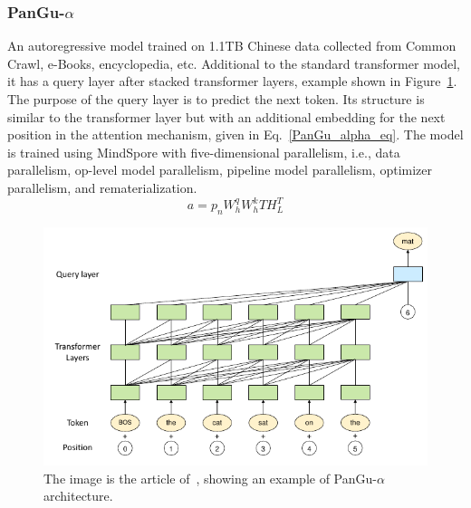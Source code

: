 \subsubsection{PanGu-$\alpha$~\cite{PanGU_alpha}}
An autoregressive model trained on 1.1TB Chinese data collected from Common Crawl, e-Books, encyclopedia, etc. Additional to the standard transformer model, it has a query layer after stacked transformer layers, example shown in Figure~\ref{pangu_alpha_image}. The purpose of the query layer is to predict the next token. Its structure is similar to the transformer layer but with an additional embedding for the next position in the attention mechanism, given in Eq.~\ref{PanGu_alpha_eq}. The model is trained using MindSpore with five-dimensional parallelism, i.e., data parallelism, op-level model parallelism, pipeline model parallelism, optimizer parallelism, and rematerialization. 
\begin{equation}
a = p_nW_h^qW_h^kTH_L^T
\label{PanGu_alpha_eq}
\end{equation}

\begin{figure}[tbp]
\centering
\includegraphics[width=1\columnwidth]{Figure/PanGU_alpha.png}
\caption{The image is the article of~\cite{PanGU_alpha}, showing an example of PanGu-$\alpha$ architecture.}
\label{pangu_alpha_image}
\end{figure}


